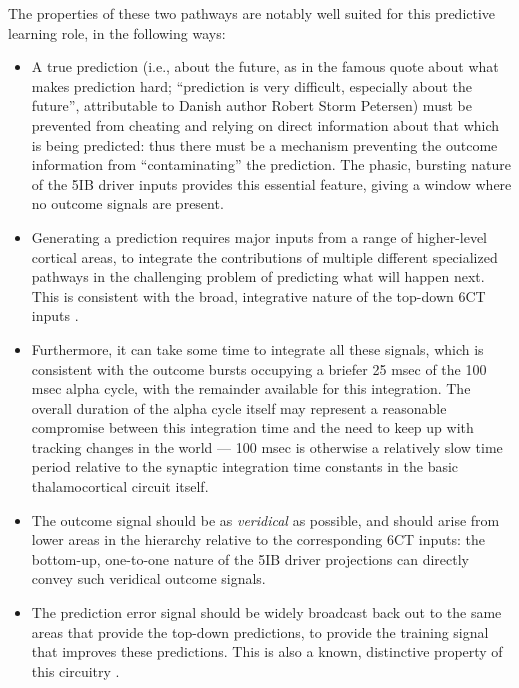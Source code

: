 \documentclass[11pt,twoside]{article}
\newif\myifpdf
\begin{document}
The properties of these two pathways are notably well suited for this predictive learning role, in the following ways:
\begin{itemize}
	\item A true prediction (i.e., about the future, as in the famous quote about what makes prediction hard; ``prediction is very difficult, especially about the future'', attributable to Danish author Robert Storm Petersen) must be prevented from cheating and relying on direct information about that which is being predicted: thus there must be a mechanism preventing the outcome information from ``contaminating'' the prediction.  The phasic, bursting nature of the 5IB driver inputs provides this essential feature, giving a window where no outcome signals are present.
	\item Generating a prediction requires major inputs from a range of higher-level cortical areas, to integrate the contributions of multiple different specialized pathways in the challenging problem of predicting what will happen next.  This is consistent with the broad, integrative nature of the top-down 6CT inputs \cite{Shipp03,Mumford91}.
	\item Furthermore, it can take some time to integrate all these signals, which is consistent with the outcome bursts occupying a briefer 25 msec of the 100 msec alpha cycle, with the remainder available for this integration.  The overall duration of the alpha cycle itself may represent a reasonable compromise between this integration time and the need to keep up with tracking changes in the world --- 100 msec is otherwise a relatively slow time period relative to the synaptic integration time constants in the basic thalamocortical circuit itself.
	\item The outcome signal should be as \emph{veridical} as possible, and should arise from lower areas in the hierarchy relative to the corresponding 6CT inputs: the bottom-up, one-to-one nature of the 5IB driver projections can directly convey such veridical outcome signals.
	\item The prediction error signal should be widely broadcast back out to the same areas that provide the top-down predictions, to provide the training signal that improves these predictions.  This is also a known, distinctive property of this circuitry \cite{Shipp03,Mumford91}.

\end{itemize}
\end{document}
